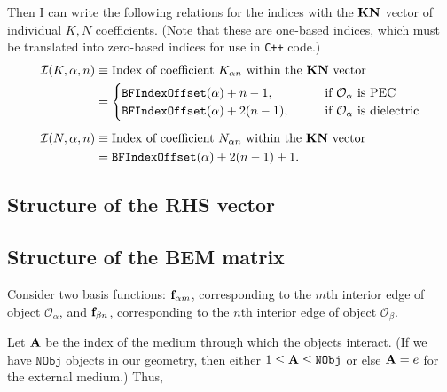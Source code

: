 \documentclass[dvips,letterpaper]{article}
\begin{document}
Then I can write the following relations for the indices 
with the $\mathbf{KN}$ vector of individual $K, N$ coefficients.
(Note that these are one-based indices, which must be translated
into zero-based indices for use in \texttt{C++} code.)
\begin{align*}
\mathcal{I}(K, \alpha, n)
&\equiv \text{Index of coefficient $K_{\alpha n}$
              within the $\mathbf{KN}$ vector}
\\
&=\begin{cases}
   \texttt{BFIndexOffset}(\alpha) + n-1, 
   \qquad &\text{if $\mathcal{O}_\alpha$ is PEC} \\
   \texttt{BFIndexOffset}(\alpha) + 2(n-1),
   \qquad &\text{if $\mathcal{O}_\alpha$ is dielectric}
  \end{cases}
\\[5pt]
\mathcal{I}(N, \alpha, n)
&\equiv \text{Index of coefficient $N_{\alpha n}$ 
              within the $\mathbf{KN}$ vector}
\\
&=\texttt{BFIndexOffset}(\alpha) + 2(n-1)+1.
\end{align*}

\subsection{Structure of the RHS vector}

\subsection{Structure of the BEM matrix}

Consider two basis functions: $\mathbf{f}_{\alpha m}$, corresponding
to the $m$th interior edge of object $\mathcal{O}_\alpha$,
and $\mathbf{f}_{\beta n}$, corresponding to the $n$th interior edge
of object $\mathcal{O}_\beta.$ 

Let $\mathbf{A}$ be the index of the medium through which the 
objects interact. (If we have $\texttt{NObj}$ objects in 
our geometry, then either $1\le \mathbf{A} \le \texttt{NObj}$ 
or else $\mathbf{A}=e$ for the external medium.) Thus,
\end{document}
